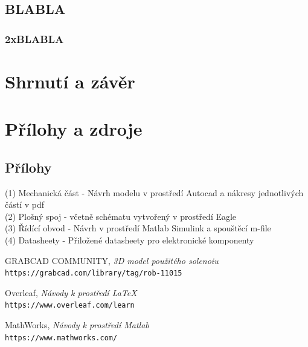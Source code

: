 \documentclass[12pt,oneside]{book} %
\begin{document}
\chapter{BLABLA}\label{BLABLA}
\section{2xBLABLA}\label{2xBLABLA}

\part{Shrnutí a závěr}\label{shrnuti}

\part{Přílohy a zdroje}\label{Pril_zdr}

\chapter{Přílohy}\label{Prilohy}

(1) Mechanická část - Návrh modelu v prostředí Autocad a nákresy jednotlivých částí v pdf\\
(2) Plošný spoj - včetně schématu vytvořený v prostředí Eagle\\
(3) Řídící obvod - Návrh v prostředí Matlab Simulink a spouštěcí m-file\\
(4) Datasheety - Přiložené datasheety pro elektronické komponenty\\


\begin{thebibliography}{9}

GRABCAD COMMUNITY,
\textit{3D model použitého solenoiu}
\\\texttt{https://grabcad.com/library/tag/rob-11015}

Overleaf,
\textit{Návody k prostředí \LaTeX\ }
\\\texttt{https://www.overleaf.com/learn}

MathWorks,
\textit{Návody k prostředí Matlab }
\\\texttt{https://www.mathworks.com/}

\end{thebibliography}
\end{document}
